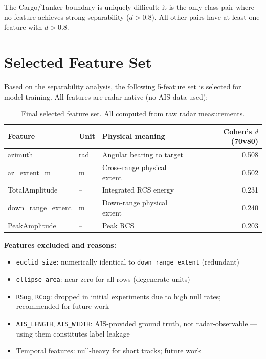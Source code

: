 \documentclass[journal]{IEEEtran}
\begin{document}
The Cargo/Tanker boundary is uniquely difficult: it is the only class pair where
no feature achieves strong separability ($d > 0.8$). All other pairs have at
least one feature with $d > 0.8$.

\section{Selected Feature Set}
\label{sec:selected}

Based on the separability analysis, the following 5-feature set is selected
for model training. All features are radar-native (no AIS data used):

\begin{table}[H]
\centering
\caption{Final selected feature set. All computed from raw radar measurements.}
\begin{tabular}{llp{6cm}r}
\toprule
\textbf{Feature} & \textbf{Unit} & \textbf{Physical meaning} & \textbf{Cohen's $d$ (70v80)} \\
\midrule
azimuth            & rad & Angular bearing to target         & 0.508 \\
az\_extent\_m      & m   & Cross-range physical extent       & 0.502 \\
TotalAmplitude     & --  & Integrated RCS energy             & 0.231 \\
down\_range\_extent & m  & Down-range physical extent        & 0.240 \\
PeakAmplitude      & --  & Peak RCS                         & 0.203 \\
\bottomrule
\end{tabular}
\end{table}

\textbf{Features excluded and reasons:}
\begin{itemize}
  \item \texttt{euclid\_size}: numerically identical to \texttt{down\_range\_extent}
        (redundant)
  \item \texttt{ellipse\_area}: near-zero for all rows (degenerate units)
  \item \texttt{RSog}, \texttt{RCog}: dropped in initial experiments due to
        high null rates; recommended for future work
  \item \texttt{AIS\_LENGTH}, \texttt{AIS\_WIDTH}: AIS-provided ground truth,
        not radar-observable — using them constitutes label leakage
  \item Temporal features: null-heavy for short tracks; future work
\end{itemize}
\end{document}
